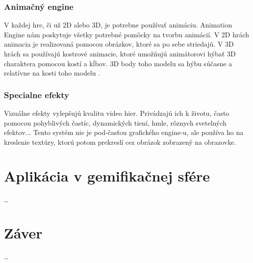 \documentclass[10pt,oneside,slovak,a4paper,hidelinks]{article}
\begin{document}
		\subsubsection{Animačný engine}
			V každej hre, či už 2D alebo 3D, je potrebne používať animáciu. Animation Engine nám poskytuje všetky potrebné pomôcky na tvorbu animácií. V 2D hrách animacia je realizovaná pomocou obrázkov, ktoré sa po sebe striedajú. V 3D hrách sa používajú kostrové animacie, ktoré umožňujú animátorovi hýbať 3D charaktera pomocou kostí a kĺbov. 3D body toho modelu sa hýbu súčasne a relatívne na kosti toho modelu \cite{Secondary}.
		\subsubsection{Specialne efekty}
			Vizuálne efekty vylepšujú kvalitu video hier. Privádzajú ich k životu, často pomocou pohyblivých častíc, dynamických tiení, hmle, rôznych svetelných efektov... Tento systém nie je pod-časťou grafického engine-u, ale používa ho na kreslenie textúry, ktorú potom prekreslí cez obrázok zobrazený na obrazovke.
	\section{Aplikácia v gemifikačnej sfére}
		\ldots
	\section{Záver}
		\ldots
	
	
	
	
	
	
\end{document}
